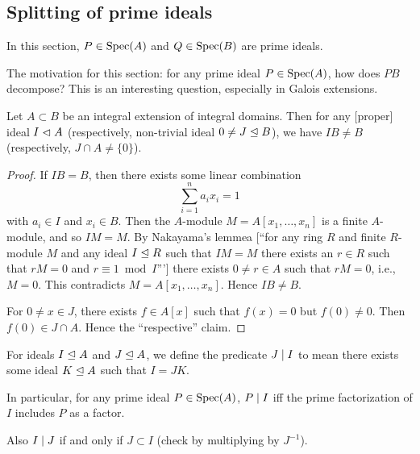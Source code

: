 \subsection{Splitting of prime ideals}

\begin{convention}
In this section, $P\in\operatorname{Spec}(A)$ and $Q\in\operatorname{Spec}(B)$ are prime ideals.
\end{convention}

\begin{node}
The motivation for this section: for any prime ideal $P\in\operatorname{Spec}(A)$,
how does $PB$ decompose? This is an interesting question, especially
in Galois extensions.
\end{node}

\begin{lemma}\label{lemma:19.1}
Let $A\subset B$ be an integral extension of integral domains. Then
for any [proper] ideal $I\mathrel{\lhd} A$ (respectively, non-trivial
ideal $0\neq J\mathrel{\trianglelefteq} B$), we have $IB\neq B$ (respectively, $J\cap A\neq\{0\}$).
\end{lemma}

\begin{proof}
If $IB=B$, then there exists some linear combination
\begin{equation}
\sum^{n}_{i=1}a_{i}x_{i}=1
\end{equation}
with $a_{i}\in I$ and $x_{i}\in B$. Then the $A$-module $M=A[x_{1},\dots,x_{n}]$
is a finite $A$-module, and so $IM=M$. By Nakayama's lemmea [``for any
  ring $R$ and finite $R$-module $M$ and any ideal $I\mathrel{\trianglelefteq} R$ such
  that $IM=M$ there exists an $r\in R$ such that $rM=0$ and $r\equiv1\bmod{I}$''']
there exists $0\neq r\in A$ such that $rM=0$, i.e., $M=0$. This
contradicts $M=A[x_{1},\dots,x_{n}]$. Hence $IB\neq B$.

For $0\neq x\in J$, there exists $f\in A[x]$ such that $f(x)=0$ but
$f(0)\neq0$. Then $f(0)\in J\cap A$. Hence the ``respective'' claim.
\end{proof}

\begin{definition}
For ideals $I\mathrel{\trianglelefteq} A$ and $J\mathrel{\trianglelefteq} A$, we define the predicate
$J\mid I$ to mean there exists some ideal $K\mathrel{\trianglelefteq} A$ such that $I=JK$.


In particular, for any prime ideal $P\in\operatorname{Spec}(A)$, $P\mid I$ iff
the prime factorization of $I$ includes $P$ as a factor.

Also $I\mid J$ if and only if $J\subset I$ (check by multiplying
by $J^{-1}$).
\end{definition}

